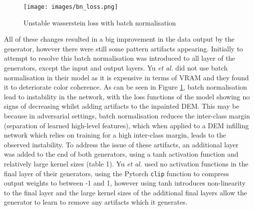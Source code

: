 \documentclass[twocolumn]{article}
\begin{document}
\begin{figure}[htbp]
\centering
\texttt{[image: images/bn\_loss.png]}
\caption{\label{fig:bn_wloss}Unstable wasserstein loss with batch normalisation}
\end{figure}

All of these changes resulted in a big improvement in the data output by the generator, however there were still some pattern artifacts appearing.
Initially to attempt to resolve this batch normalisation was introduced to all layer of the generators, except the input and output layers.
Yu \emph{et al.} did not use batch normalisation in their model as it is expensive in terms of VRAM and they found it to deteriorate color coherence.
As can be seen in Figure \ref{fig:bn_wloss}, batch normalisation lead to instability in the network, with the loss functions of the model showing no signs of decreasing whilst adding artifacts to the inpainted DEM.
This may be because in adversarial settings, batch normalisation reduces the inter-class margin (separation of learned high-level features), which when applied to a DEM infilling network which relies on training for a high inter-class margin, leads to the observed instability\autocite{kongWhyDoesBatch2023}.
To address the issue of these artifacts, an additional layer was added to the end of both generators, using a tanh activation function and relatively large kernel sizes (table 1).
Yu \emph{et al.} used no activation functions in the final layer of their generators, using the Pytorch \texttt{clip} function to compress output weights to between -1 and 1, however using tanh introduces non-linearity to the final layer and the large kernel sizes of the additional final layers allow the generator to learn to remove any artifacts which it generates.
\end{document}
